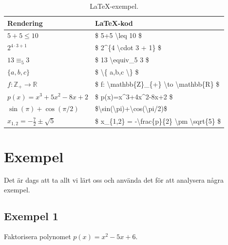 \documentclass[titlepage]{article}
\begin{document}
\begin{table}[H]
    \begin{center}
        \begin{tabular}{| l | l |}
            \hline
            \textbf{Rendering} & \textbf{\LaTeX-kod} \\
            \hline
            $5+5 \leq 10$ & \$ 5+5 \textbackslash leq 10 \$ \\
            \hline
            $2^{4\cdot3 + 1}$ & \$ 2\textasciicircum \{4 \textbackslash cdot 3 + 1\} \$ \\
            \hline
            $13 \equiv_5 3$ & \$ 13 \textbackslash equiv\_5 3 \$ \\
            \hline
            $\{a,b,c\}$ & \$ \textbackslash\{ a,b,c \textbackslash\} \$ \\
            \hline
            $f:\mathbb{Z}_{+} \to \mathbb{R}$ & \$ f: \textbackslash mathbb\{Z\}\_\{+\} \textbackslash to \textbackslash mathbb\{R\} \$ \\
            \hline
            $p(x)=x^3+5x^2-8x+2$ & \$ p(x)=x\textasciicircum 3+4x\textasciicircum 2-8x+2 \$ \\
            \hline
            $\sin(\pi)+\cos(\pi/2)$ & \$\textbackslash sin(\textbackslash pi)+\textbackslash cos(\textbackslash pi/2)\$ \\
            \hline
            $x_{1,2} = -\frac{7}{2} \pm \sqrt{5}$ & \$ x\_\{1,2\} = -\textbackslash frac\{p\}\{2\} \textbackslash pm \textbackslash sqrt\{5\} \$ \\
            \hline
        \end{tabular}
        \caption{\LaTeX-exempel.}
        \label{t3}
    \end{center}
\end{table}





\section{Exempel}

Det är dags att ta allt vi lärt oss och använda det för att analysera några exempel.


\subsection*{Exempel 1}

\begin{center}
\begin{tcolorbox}[width=\linewidth,colback={white},title={\textbf{Problem}},outer arc=0mm,colupper=black]
    Faktorisera polynomet $p(x)=x^2-5x+6$.
\end{tcolorbox} 
\end{center}
\end{document}
